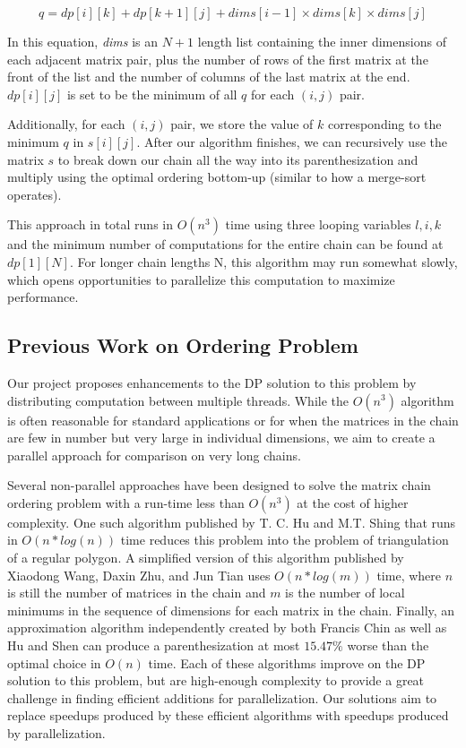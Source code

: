 \documentclass[conference,leqno]{IEEEtran}
\begin{document}
\begin{equation}
    q = dp[i][k] + dp[k + 1][j] + dims[i - 1] \times dims[k] \times dims[j]
\end{equation}

In this equation, \emph{dims} is an $N + 1$ length list containing the inner dimensions of each adjacent matrix pair, plus the number of rows of the first matrix at the front of the list and the number of columns of the last matrix at the end. $dp[i][j]$ is set to be the minimum of all $q$ for each $(i, j)$ pair.

Additionally, for each $(i,j)$ pair, we store the value of $k$ corresponding to the minimum $q$ in $s[i][j]$. After our algorithm finishes, we can recursively use the matrix $s$ to break down our chain all the way into its parenthesization and multiply using the optimal ordering bottom-up (similar to how a merge-sort operates).

This approach in total runs in $O(n^3)$ time using three looping variables $l, i, k$ and the minimum number of computations for the entire chain can be found at $dp[1][N]$. For longer chain lengths N, this algorithm may run somewhat slowly, which opens opportunities to parallelize this computation to maximize performance.

\subsection{Previous Work on Ordering Problem}
Our project proposes enhancements to the DP solution to this problem by distributing computation between multiple threads. While the $O(n^3)$ algorithm is often reasonable for standard applications or for when the matrices in the chain are few in number but very large in individual dimensions, we aim to create a parallel approach for comparison on very long chains.

Several non-parallel approaches have been designed to solve the matrix chain ordering problem with a run-time less than $O(n^3)$ at the cost of higher complexity. One such algorithm published by T. C. Hu and M.T. Shing that runs in $O(n*log(n))$ time reduces this problem into the problem of triangulation of a regular polygon\cite{b1}. A simplified version of this algorithm published by Xiaodong Wang, Daxin Zhu, and Jun Tian uses $O(n*log(m))$ time, where $n$ is still the number of matrices in the chain and $m$ is the number of local minimums in the sequence of dimensions for each matrix in the chain\cite{b2}. Finally, an approximation algorithm independently created by both Francis Chin\cite{b3} as well as Hu and Shen\cite{b4} can produce a parenthesization at most $15.47\%$ worse than the optimal choice in $O(n)$ time. Each of these algorithms improve on the DP solution to this problem, but are high-enough complexity to provide a great challenge in finding efficient additions for parallelization. Our solutions aim to replace speedups produced by these efficient algorithms with speedups produced by parallelization.
\end{document}
